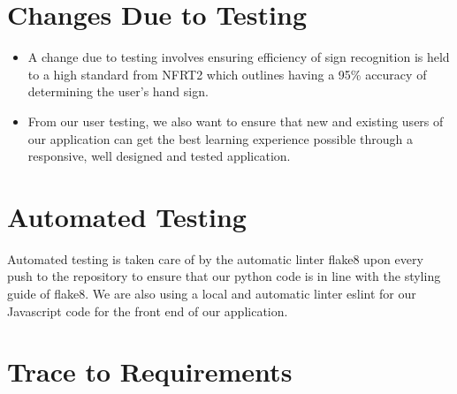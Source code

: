 \documentclass[12pt, titlepage]{article}
\begin{document}
\section{Changes Due to Testing}

\begin{itemize}

    \item A change due to testing involves ensuring efficiency of sign recognition is held to a high standard from NFRT2 which outlines having a 95\% accuracy of determining the user's hand sign.

    \item From our user testing, we also want to ensure that new and existing users of our application can get the best learning experience possible through a responsive, well designed and tested application.
\end{itemize}

\section{Automated Testing}

Automated testing is taken care of by the automatic linter flake8 upon every push to the repository to ensure that our python code is in line with the styling guide of flake8. We are also using a local and automatic linter eslint for our Javascript code for the front end of our application. 

\section{Trace to Requirements}
\end{document}
